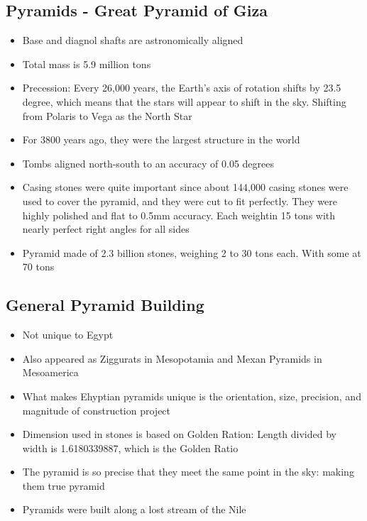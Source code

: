 \documentclass{article}
\begin{document}
\subsection{Pyramids - Great Pyramid of Giza}
\begin{itemize}
  \item Base and diagnol shafts are astronomically aligned
  \item Total mass is 5.9 million tons
  \item Precession: Every 26,000 years, the Earth's axis
    of rotation shifts by 23.5 degree, which means that the stars
    will appear to shift in the sky. Shifting from Polaris to Vega as the North Star
  \item For 3800 years ago, they were the largest structure in the world
  \item Tombs aligned north-south to an accuracy of 0.05 degrees
  \item Casing stones were quite important since about 144,000 casing stones
    were used to cover the pyramid, and they were cut to fit perfectly.
    They were highly polished and flat to 0.5mm accuracy. Each weightin 15 tons with nearly
    perfect right angles for all sides
  \item Pyramid made of 2.3 billion stones, weighing 2 to 30 tons each. With some at 70 tons
\end{itemize}

\subsection{General Pyramid Building}
\begin{itemize}
  \item Not unique to Egypt
  \item Also appeared as Ziggurats in Mesopotamia and
    Mexan Pyramids in Mesoamerica
  \item What makes Ehyptian pyramids unique is the
    orientation,
    size, precision, and magnitude of construction project
  \item Dimension used in stones is based on Golden Ration: Length divided by width
    is 1.6180339887, which is the Golden Ratio
  \item The pyramid is so precise that they meet the same point in the sky:
    making them true pyramid
  \item Pyramids were built along a lost
    stream of the Nile
\end{itemize}
\end{document}
